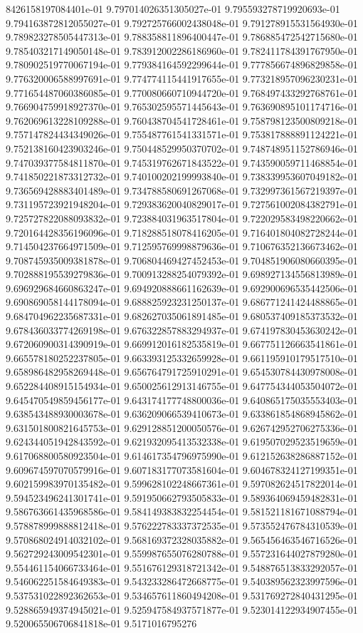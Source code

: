 8426158197084401e-01	9.797014026351305027e-01	9.795593278719920693e-01	9.794163872812055027e-01	9.792725766002438048e-01	9.791278915531564930e-01	9.789823278505447313e-01	9.788358811896400447e-01	9.786885472542715680e-01	9.785403217149050148e-01	9.783912002286186960e-01	9.782411784391767950e-01	9.780902519770067194e-01	9.779384164592299644e-01	9.777856674896829858e-01	9.776320006588997691e-01	9.774774115441917655e-01	9.773218957096230231e-01	9.771654487060386085e-01	9.770080660710944720e-01	9.768497433292768761e-01	9.766904759918927370e-01	9.765302595571445643e-01	9.763690895101174716e-01	9.762069613228109288e-01	9.760438704541728461e-01	9.758798123500809218e-01	9.757147824434349026e-01	9.755487761541331571e-01	9.753817888891124221e-01	9.752138160423903246e-01	9.750448529950370702e-01	9.748748951152786946e-01	9.747039377584811870e-01	9.745319762671843522e-01	9.743590059711468854e-01	9.741850221873312732e-01	9.740100202199993840e-01	9.738339953607049182e-01	9.736569428883401489e-01	9.734788580691267068e-01	9.732997361567219397e-01	9.731195723921948204e-01	9.729383620040829017e-01	9.727561002084382791e-01	9.725727822088093832e-01	9.723884031963517804e-01	9.722029583498220662e-01	9.720164428356196096e-01	9.718288518078416205e-01	9.716401804082728244e-01	9.714504237664971509e-01	9.712595769998879636e-01	9.710676352136673462e-01	9.708745935009381878e-01	9.706804469427452453e-01	9.704851906080660395e-01	9.702888195539279836e-01	9.700913288254079392e-01	9.698927134556813989e-01	9.696929684660863247e-01	9.694920888661162639e-01	9.692900696535442506e-01	9.690869058144178094e-01	9.688825923231250137e-01	9.686771241424488865e-01	9.684704962235687331e-01	9.682627035061891485e-01	9.680537409185373532e-01	9.678436033774269198e-01	9.676322857883294937e-01	9.674197830453630242e-01	9.672060900314390919e-01	9.669912016182535819e-01	9.667751126663541861e-01	9.665578180252237805e-01	9.663393125332659928e-01	9.661195910179517510e-01	9.658986482958269448e-01	9.656764791725910291e-01	9.654530784430978008e-01	9.652284408915154934e-01	9.650025612913146755e-01	9.647754344053504072e-01	9.645470549859456177e-01	9.643174177748800036e-01	9.640865175035553403e-01	9.638543488930003678e-01	9.636209066539410673e-01	9.633861854868945862e-01	9.631501800821645753e-01	9.629128851200050576e-01	9.626742952706275336e-01	9.624344051942843592e-01	9.621932095413532338e-01	9.619507029523519659e-01	9.617068800580923504e-01	9.614617354796975990e-01	9.612152638286887152e-01	9.609674597070579916e-01	9.607183177073581604e-01	9.604678324127199351e-01	9.602159983970135482e-01	9.599628102248667361e-01	9.597082624517822014e-01	9.594523496241301741e-01	9.591950662793505833e-01	9.589364069459482831e-01	9.586763661435968586e-01	9.584149383832254454e-01	9.581521181671088794e-01	9.578878999888812418e-01	9.576222783337372535e-01	9.573552476784310539e-01	9.570868024914032102e-01	9.568169372328035882e-01	9.565456463546716526e-01	9.562729243009542301e-01	9.559987655076280788e-01	9.557231644027879280e-01	9.554461154066733464e-01	9.551676129318721342e-01	9.548876513833292057e-01	9.546062251584649383e-01	9.543233286472668775e-01	9.540389562323997596e-01	9.537531022892362653e-01	9.534657611860494208e-01	9.531769272840431295e-01	9.528865949374945021e-01	9.525947584937571877e-01	9.523014122934907455e-01	9.520065506706841818e-01	9.5171016795276
